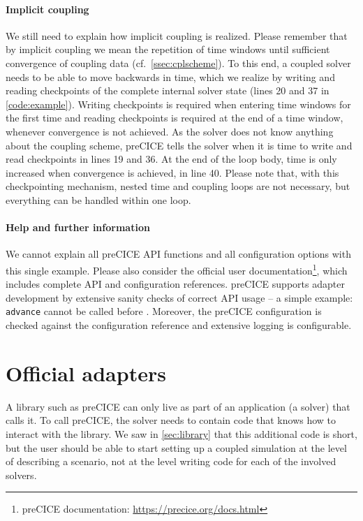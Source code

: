 \paragraph{Implicit coupling}
We still need to explain how implicit coupling is realized. Please remember that by implicit coupling we mean the repetition of time windows until sufficient convergence of coupling data (cf.~\autoref{ssec:cplscheme}). To this end, a coupled solver needs to be able to move backwards in time, which we realize by writing and reading checkpoints of the complete internal solver state (lines 20 and 37 in \autoref{code:example}). Writing checkpoints is required when entering time windows for the first time and reading checkpoints is required at the end of a time window, whenever convergence is not achieved. As the solver does not know anything about the coupling scheme, preCICE tells the solver when it is time to write and read checkpoints in lines 19 and 36. At the end of the loop body, time is only increased when convergence is achieved, in line 40. Please note that, with this checkpointing mechanism, nested time and coupling loops are not necessary, but everything can be handled within one  loop.


\paragraph{Help and further information}
We cannot explain all preCICE API functions and all configuration options with this single example. Please also consider the official user documentation\footnote{preCICE documentation: \url{https://precice.org/docs.html}}, which includes complete API and configuration references.
preCICE supports adapter development by extensive sanity checks of correct API usage -- a simple example: \texttt{advance} cannot be called before . Moreover, the preCICE configuration is checked against the configuration reference and extensive logging is configurable.


 \section{Official adapters}
\label{sec:adapters}

A library such as preCICE can only live as part of an application (a solver) that calls it.
To call preCICE, the solver needs to contain code that knows how to interact with the library.
We saw in \autoref{sec:library} that this additional code is short, but the user should be able to start setting up
a coupled simulation at the level of describing a scenario, not at the level writing code for each of the involved solvers. 

